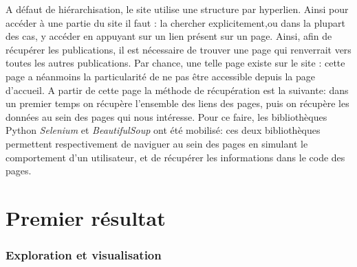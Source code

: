 \documentclass[12pt,a4paper,oneside,titlepage]{article} %
\begin{document}
	A défaut de hiérarchisation, le site utilise une structure par hyperlien. Ainsi pour accéder à une partie du site il faut : la chercher explicitement,ou dans la plupart des cas, y accéder en appuyant sur un lien présent sur un page. 
	Ainsi, afin de récupérer les publications, il est nécessaire de trouver une page qui renverrait vers toutes les autres publications. Par chance, une telle page existe sur le site : cette page a néanmoins la particularité de ne pas être accessible depuis la page d'accueil.
	A partir de cette page la méthode de récupération est la suivante: dans un premier temps on récupère l'ensemble des liens des pages, puis on récupère les données au sein des pages qui nous intéresse. 
	Pour ce faire, les bibliothèques Python \emph{Selenium} et \emph{BeautifulSoup} ont été mobilisé: ces deux bibliothèques permettent respectivement de naviguer au sein des pages en simulant le comportement d'un utilisateur, et de récupérer les informations dans le code des pages. 
	
	
	
	
	\section*{Premier résultat}
	
	\subsubsection{Exploration et visualisation}
	
	
	
	
	

	

			\pagebreak
	\printbibliography
\end{document}
